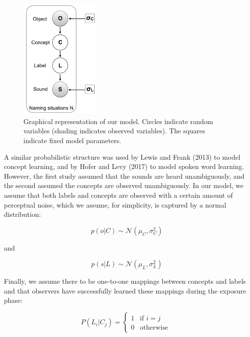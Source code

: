 \documentclass[english,,man,floatsintext]{apa6}
\theoremstyle{definition}
\theoremstyle{definition}
\theoremstyle{definition}
\theoremstyle{remark}
\begin{document}
\begin{figure}

{\centering \includegraphics[width=150px]{figs/model} 

}

\caption{Graphical representation of our model. Circles indicate random variables (shading indicates observed variables). The squares indicate fixed model parameters.}\label{fig:model}
\end{figure}

A similar probabilistic structure was used by Lewis and Frank (2013) to
model concept learning, and by Hofer and Levy (2017) to model spoken
word learning. However, the first study assumed that the sounds are
heard unambiguously, and the second assumed the concepts are observed
unambiguously. In our model, we assume that both labels and concepts are
observed with a certain amount of perceptual noise, which we assume, for
simplicity, is captured by a normal distribution:

\begin{equation} \label{eq:object}
 p(o | C) \sim  \mathcal{N}(\mu_C, \sigma^2_C) 
\end{equation}

\begin{center}
and 
\end{center}

\begin{equation} \label{eq:sound}
p(s| L) \sim  \mathcal{N}(\mu_L, \sigma^2_L)
\end{equation}

Finally, we assume there to be one-to-one mappings between concepts and
labels and that observers have successfully learned these mappings
during the exposure phase:

\begin{equation}
P(L_i|C_j) = 
\begin{cases}
  1 & \text{if  }  i=j \\  
  0  & \text{otherwise  }
\end{cases}
\end{equation}
\end{document}
